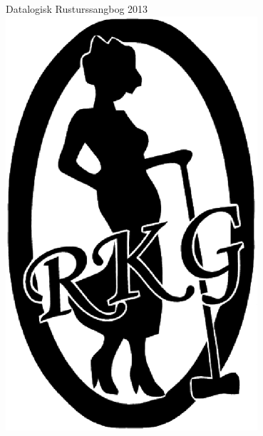 \pagestyle{empty}
\begin{center}
  {\LARGE Datalogisk Rusturssangbog 2013}\\
  \includegraphics[width=0.7\textwidth]{logo.eps}
\end{center}

\newpage
{}
